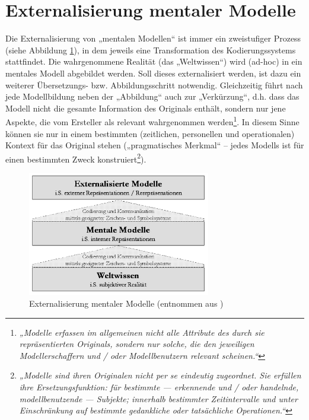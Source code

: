 \section{Externalisierung mentaler Modelle} %
\label{sec:externalisierung_mentaler_modelle}

Die Externalisierung von „mentalen Modellen“ ist immer ein zweistufiger Prozess (siehe Abbildung \ref{fig:img_MentaleModelle_iffenthaler_externalisierung}), in dem jeweils eine Transformation des Kodierungssystems stattfindet. Die wahrgenommene Realität (das „Weltwissen“) wird (ad-hoc) in ein mentales Modell abgebildet werden. Soll dieses externalisiert werden, ist dazu ein weiterer Übersetzungs- bzw. Abbildungsschritt notwendig. Gleichzeitig führt nach \citet{Stachowiak73} jede Modellbildung neben der „Abbildung“ auch zur „Verkürzung“, d.h. dass das Modell nicht die gesamte Information des Originals enthält, sondern nur jene Aspekte, die vom Ersteller als relevant wahrgenommen werden\footnote{\emph{„Modelle erfassen im allgemeinen nicht alle Attribute des durch sie repräsentierten Originals, sondern nur solche, die den jeweiligen Modellerschaffern und / oder Modellbenutzern relevant scheinen.“}\citep{Stachowiak73}}. In diesem Sinne können sie nur in einem bestimmten (zeitlichen, personellen und operationalen) Kontext für das Original stehen („pragmatisches Merkmal“ -- jedes Modells ist für einen bestimmten Zweck konstruiert\footnote{\emph{„Modelle sind ihren Originalen nicht per se eindeutig zugeordnet. Sie erfüllen ihre Ersetzungsfunktion: für bestimmte — erkennende und / oder handelnde, modellbenutzende — Subjekte; innerhalb bestimmter Zeitintervalle und unter Einschränkung auf bestimmte gedankliche oder tatsächliche Operationen.“}\citep{Stachowiak73}}).

\begin{figure}[htbp]
	\centering
		\includegraphics[width=8cm]{img/MentaleModelle/iffenthaler_externalisierung.png}
	\caption[Externalisierung mentaler Modelle]{Externalisierung mentaler Modelle (entnommen aus \citep{Ifenthaler06})}
	\label{fig:img_MentaleModelle_iffenthaler_externalisierung}
\end{figure}

